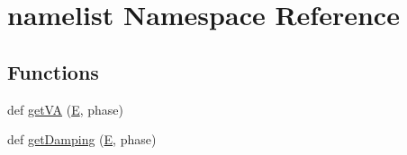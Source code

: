 \hypertarget{namespacenamelist}{}\section{namelist Namespace Reference}
\label{namespacenamelist}
\subsection*{Functions}
\begin{DoxyCompactItemize}
\item 
def \hyperlink{namespacenamelist_a46cfef786541cc5937eba1e0cda48f31}{get\+VA} (\hyperlink{namespacenamelist_a732e08e1d7e605a46b2db15805f34db0}{E}, phase)
\item 
def \hyperlink{namespacenamelist_a84b4e870f028d6260f181fc10be58da6}{get\+Damping} (\hyperlink{namespacenamelist_a732e08e1d7e605a46b2db15805f34db0}{E}, phase)
\end{DoxyCompactItemize}
